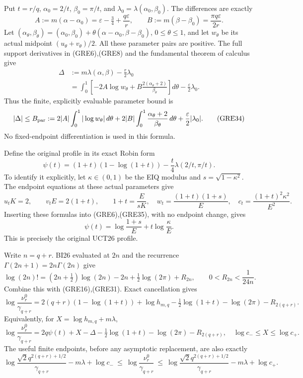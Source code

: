 \documentclass[11pt,a4paper]{article}
\begin{document}
Put $t=r/q$, $\alpha_0=2/t$, $\beta_0=\pi/t$, and
$\lambda_0=\lambda(\alpha_0,\beta_0)$. The differences are exactly
\[
 A:=m(\alpha-\alpha_0)=\varepsilon-\tfrac34+
                              \frac{q\varepsilon}{r},\qquad
 B:=m(\beta-\beta_0)=\frac{\pi q\varepsilon}{2r}.
 \tag{GRE32}
\]
Let $(\alpha_\theta,\beta_\theta)
=(\alpha_0,\beta_0)+\theta(\alpha-\alpha_0,\beta-\beta_0)$,
$0\le\theta\le1$, and let $w_\theta$ be its actual midpoint
$(u_\theta+v_\theta)/2$. All these parameter pairs are positive.
The full support derivatives in (GRE6),(GRE8) and the fundamental
theorem of calculus give
\[
 \begin{split}
 \Delta&:=m\lambda(\alpha,\beta)-\frac r2\lambda_0\\
 &=\int_0^1\left[-2A\log w_\theta+
              B\frac{2(\alpha_\theta+2)}{\beta_\theta}\right]d\theta
             -\frac\varepsilon2\lambda_0.
 \end{split}\tag{GRE33}
\]
Thus the finite, explicitly evaluable parameter bound is
\[
 |\Delta|\le B_{\rm par}:=
 2|A|\int_0^1|\log w_\theta|\,d\theta+
 2|B|\int_0^1\frac{\alpha_\theta+2}{\beta_\theta}\,d\theta
 +\frac\varepsilon2|\lambda_0|.
 \tag{GRE34}
\]
No fixed-endpoint differentiation is used in this formula.

Define the original profile in its exact Robin form
\[
 \psi(t)=(1+t)(1-\log(1+t))
                  -\frac t4\lambda(2/t,\pi/t).
 \tag{GRE35}
\]
To identify it explicitly, let $\kappa\in(0,1)$ be the EIQ modulus
and $s=\sqrt{1-\kappa^2}$. The endpoint equations at these actual
parameters give
\[
 u_tK=2,\qquad v_tE=2(1+t),\qquad
 1+t=\frac E{sK},\quad
 w_t=\frac{(1+t)(1+s)}E,\quad
 c_t=\frac{(1+t)^2\kappa^2}{E^2}.
\]
Inserting these formulas into (GRE6),(GRE35), with no endpoint change,
gives
\[
 \psi(t)=\log\frac{1+s}E+t\log\frac\kappa E.
 \tag{GRE36}
\]
This is precisely the original UCT26 profile.

Write $n=q+r$. BI26 evaluated at $2n$ and the recurrence
$\Gamma(2n+1)=2n\Gamma(2n)$ give
\[
 \log(2n)!=(2n+\tfrac12)\log(2n)-2n+
               \tfrac12\log(2\pi)+R_{2n},
 \qquad0<R_{2n}<\frac1{24n}.
\]
Combine this with (GRE16),(GRE31). Exact cancellation gives
\[
 \log\frac{\nu_r^0}{\gamma_{q+r}}
 =2(q+r)(1-\log(1+t))+\log h_{m,q}
        -\tfrac12\log(1+t)-\log(2\pi)-R_{2(q+r)}.
 \tag{GRE37}
\]
Equivalently, for $X=\log h_{m,q}+m\lambda$,
\[
 \boxed{\log\frac{\nu_r^0}{\gamma_{q+r}}
 =2q\psi(t)+X-\Delta-
         \tfrac12\log(1+t)-\log(2\pi)-R_{2(q+r)},
 \quad\log c_-\le X\le\log c_+.}
 \tag{GRE38}
\]
The useful finite endpoints, before any asymptotic replacement, are
also exactly
\[
 \log\frac{\sqrt2q^{2(q+r)+1/2}}{\gamma_{q+r}}
 -m\lambda+\log c_-
 \ \le\ \log\frac{\nu_r^0}{\gamma_{q+r}}
 \ \le\
 \log\frac{\sqrt2q^{2(q+r)+1/2}}{\gamma_{q+r}}
 -m\lambda+\log c_+.
 \tag{GRE39}
\]
\end{document}
